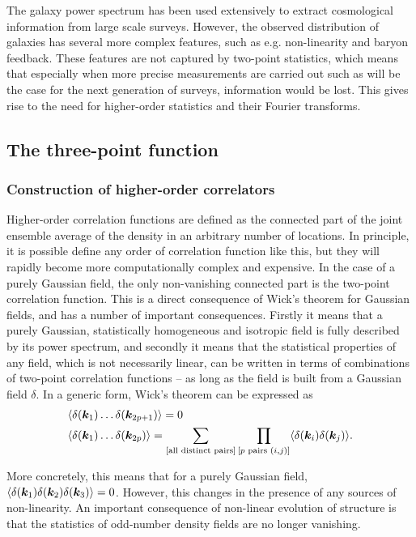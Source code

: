 The galaxy power spectrum has been used extensively to extract cosmological information from large scale surveys. However, the observed distribution of galaxies has several more complex features, such as e.g. non-linearity and baryon feedback. These features are not captured by two-point statistics, which means that especially when more precise measurements are carried out such as will be the case for the next generation of surveys, information would be lost. This gives rise to the need for higher-order statistics and their Fourier transforms. 

\subsection{The three-point function}

\subsubsection{Construction of higher-order correlators}

Higher-order correlation functions are defined as the connected part of the joint ensemble average of the density in an arbitrary number of locations. In principle, it is possible define any order of correlation function like this, but they will rapidly become more computationally complex and expensive. In the case of a purely Gaussian field, the only non-vanishing connected part is the two-point correlation function. This is a direct consequence of Wick's theorem for Gaussian fields, and has a number of important consequences. Firstly it means that a purely Gaussian, statistically homogeneous and isotropic field is fully described by its power spectrum, and secondly it means that the statistical properties of any field, which is not necessarily linear, can be written in terms of combinations of two-point correlation functions -- as long as the field is built from a Gaussian field $\delta$. In a generic form, Wick's theorem can be expressed as 
\begin{align}
	&\langle \delta(\bm {k}_1) \ldots \delta(\bm{k}_{2p + 1}) \rangle = 0 \nonumber \\
	&\langle \delta(\bm {k}_1) \ldots \delta(\bm{k}_{2p})\rangle = \sum_{[\text{all distinct pairs}]} \prod_{[p \text{ pairs } (i,j)]} \langle \delta(\bm{k}_i) \delta(\bm{k}_j) \rangle.  
\end{align}

More concretely, this means that for a purely Gaussian field, $\langle \delta(\bm {k}_1) \delta(\bm {k}_2) \delta(\bm {k}_3)\rangle = 0$. However, this changes in the presence of any sources of non-linearity. An important consequence of non-linear evolution of structure is that the statistics of odd-number density fields are no longer vanishing. 

